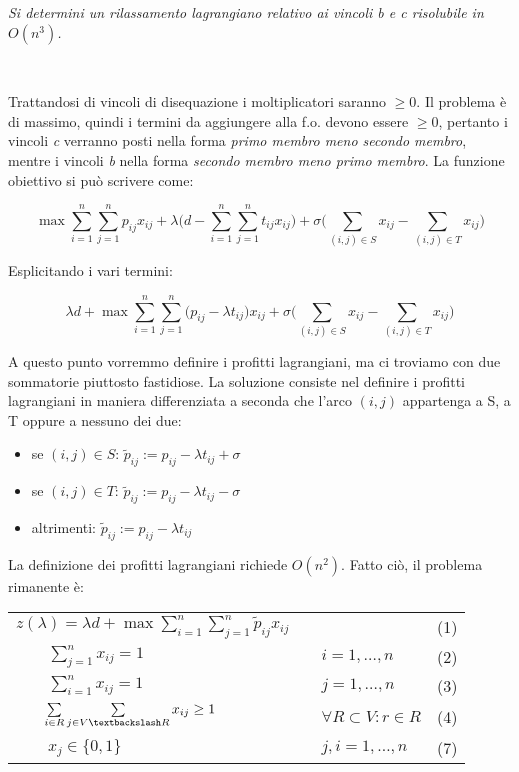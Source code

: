 \documentclass[11pt]{book}
\begin{document}
\textit{Si determini un rilassamento lagrangiano relativo ai vincoli b e c
risolubile in $O(n^3)$.}

\

Trattandosi di vincoli di disequazione i moltiplicatori saranno $\geq
0$. Il pro\-ble\-ma \`e di massimo, quindi i termini da aggiungere
alla f.o. devono essere $\geq 0$, pertanto i vincoli \textit{c}
verranno posti nella forma \textit{primo membro meno secondo membro},
mentre i vincoli \textit{b} nella forma \textit{secondo membro meno
  primo membro}. La funzione obiettivo si pu\`o scrivere come:

$$
\max \sum\limits_{i=1}^n\sum\limits_{j=1}^np_{ij}x_{ij} + \lambda
\biggr (d
-\sum\limits_{i=1}^n\sum\limits_{j=1}^n t_{ij}x_{ij}\biggr ) + \sigma
\biggr (\sum\limits_{(i,j) \in S}x_{ij} - \sum\limits_{(i,j) \in
  T}x_{ij} \biggr )
$$

Esplicitando i vari termini:

$$
\lambda d + \max \sum\limits_{i=1}^n\sum\limits_{j=1}^n
\biggr (p_{ij}-\lambda t_{ij} \biggr )x_{ij} + \sigma
\biggr (\sum\limits_{(i,j) \in S}x_{ij} - \sum\limits_{(i,j) \in
  T}x_{ij} \biggr )
$$

A questo punto vorremmo definire i pro\-fit\-ti lagrangiani, ma ci
troviamo con due sommatorie piuttosto fastidiose. La soluzione
consiste nel definire i profitti lagrangiani in maniera differenziata
a seconda che l'arco $(i,j)$ appartenga a S, a T oppure a nessuno dei
due:

\begin{itemize}
\item se $(i,j) \in S$: $\tilde{p}_{ij} := p_{ij}-\lambda t_{ij} + \sigma$
\item se $(i,j) \in T$: $\tilde{p}_{ij} := p_{ij}-\lambda t_{ij} - \sigma$
\item altrimenti:  $\tilde{p}_{ij} := p_{ij}-\lambda t_{ij}$
\end{itemize}

La definizione dei profitti lagrangiani richiede $O(n^2)$. Fatto
ci\`o, il problema rimanente \`e:

\begin{center}
\begin{tabular}{lp{2cm}ll}
  $z(\lambda) = \lambda d + \max \sum\limits_{i=1}^n\sum\limits_{j=1}^n \tilde{p}_{ij}x_{ij}$ & & & (1)\\
  $\qquad \sum\limits_{j=1}^n x_{ij} = 1$ & & $i=1,\dots,n$ & (2)\\
  $\qquad \sum\limits_{i=1}^n x_{ij} = 1$ & & $j=1,\dots,n$ & (3)\\
  $\qquad \sum\limits_{i \in R}\sum\limits_{j \in V \textbackslash R}
  x_{ij} \geq 1$ & & $\forall R \subset V : r \in R$ & (4) \\
  $\qquad x_j \in\{0,1\}$ & & $j,i = 1,\dots,n$ & (7) \\
\end{tabular}
\end{center}
\end{document}
